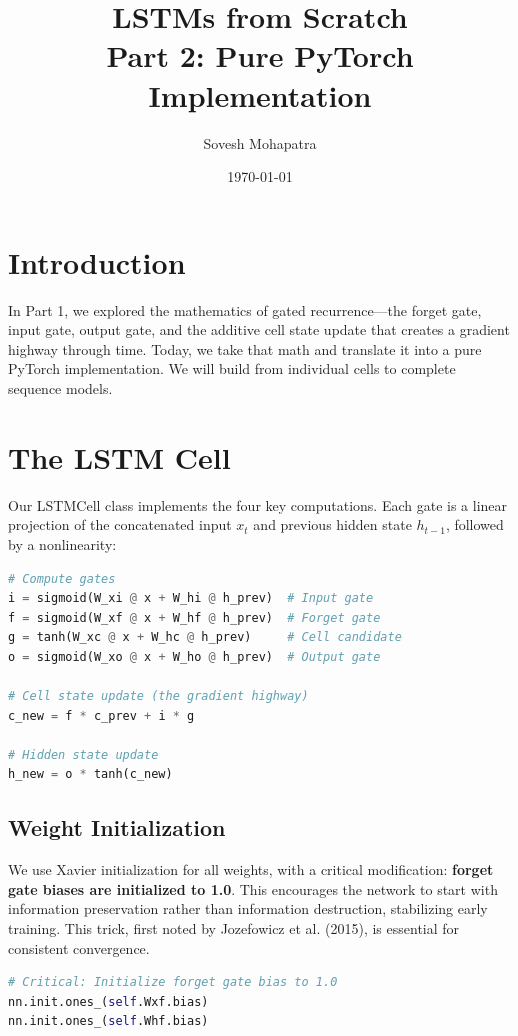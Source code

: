 \documentclass[12pt]{article}
\title{\textbf{LSTMs from Scratch \\ Part 2: Pure PyTorch Implementation}}
\author{Sovesh Mohapatra}
\date{\today}
\begin{document}
\maketitle

\section*{Introduction}
In Part 1, we explored the mathematics of gated recurrence---the forget gate, input gate, output gate, and the additive cell state update that creates a gradient highway through time. Today, we take that math and translate it into a pure PyTorch implementation. We will build from individual cells to complete sequence models.

\section*{The LSTM Cell}
Our LSTMCell class implements the four key computations. Each gate is a linear projection of the concatenated input $x_t$ and previous hidden state $h_{t-1}$, followed by a nonlinearity:

\begin{lstlisting}[language=Python, basicstyle=\small\ttfamily, commentstyle=\color{green!60!black}]
# Compute gates
i = sigmoid(W_xi @ x + W_hi @ h_prev)  # Input gate
f = sigmoid(W_xf @ x + W_hf @ h_prev)  # Forget gate
g = tanh(W_xc @ x + W_hc @ h_prev)     # Cell candidate
o = sigmoid(W_xo @ x + W_ho @ h_prev)  # Output gate

# Cell state update (the gradient highway)
c_new = f * c_prev + i * g

# Hidden state update
h_new = o * tanh(c_new)
\end{lstlisting}

\subsection*{Weight Initialization}
We use Xavier initialization for all weights, with a critical modification: \textbf{forget gate biases are initialized to 1.0}. This encourages the network to start with information preservation rather than information destruction, stabilizing early training. This trick, first noted by Jozefowicz et al. (2015), is essential for consistent convergence.

\begin{lstlisting}[language=Python, basicstyle=\small\ttfamily, commentstyle=\color{green!60!black}]
# Critical: Initialize forget gate bias to 1.0
nn.init.ones_(self.Wxf.bias)
nn.init.ones_(self.Whf.bias)
\end{lstlisting}
\end{document}
